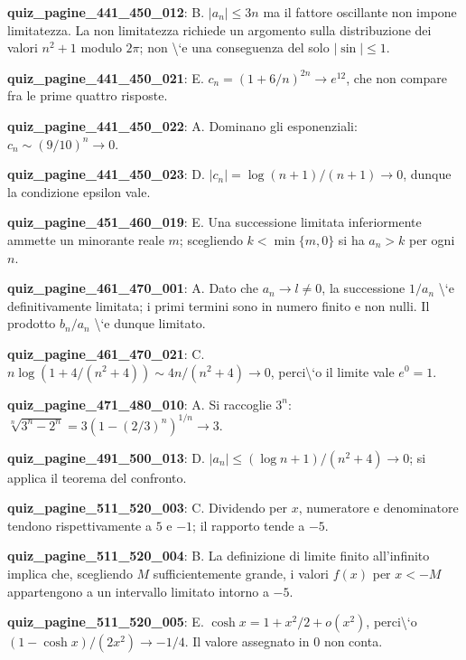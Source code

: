 \documentclass[11pt,a4paper]{article}
\newcounter{quiz}
\begin{document}
\noindent\textbf{quiz\_pagine\_441\_450\_012}: B. $|a_n|\le3n$ ma il fattore oscillante non impone limitatezza. La non limitatezza richiede un argomento sulla distribuzione dei valori $n^2+1$ modulo $2\pi$; non \textbackslash{}`e una conseguenza del solo $|\sin|\le1$.\par\medskip
\noindent\textbf{quiz\_pagine\_441\_450\_021}: E. $c_n=(1+6/n)^{2n}\to e^{12}$, che non compare fra le prime quattro risposte.\par\medskip
\noindent\textbf{quiz\_pagine\_441\_450\_022}: A. Dominano gli esponenziali: $c_n\sim(9/10)^n\to0$.\par\medskip
\noindent\textbf{quiz\_pagine\_441\_450\_023}: D. $|c_n|=\log(n+1)/(n+1)\to0$, dunque la condizione epsilon vale.\par\medskip
\noindent\textbf{quiz\_pagine\_451\_460\_019}: E. Una successione limitata inferiormente ammette un minorante reale $m$; scegliendo $k<\min\{m,0\}$ si ha $a_n>k$ per ogni $n$.\par\medskip
\noindent\textbf{quiz\_pagine\_461\_470\_001}: A. Dato che $a_n\to l\neq0$, la successione $1/a_n$ \textbackslash{}`e definitivamente limitata; i primi termini sono in numero finito e non nulli. Il prodotto $b_n/a_n$ \textbackslash{}`e dunque limitato.\par\medskip
\noindent\textbf{quiz\_pagine\_461\_470\_021}: C. $n\log(1+4/(n^2+4))\sim4n/(n^2+4)\to0$, perci\textbackslash{}`o il limite vale $e^0=1$.\par\medskip
\noindent\textbf{quiz\_pagine\_471\_480\_010}: A. Si raccoglie $3^n$: $\sqrt[n]{3^n-2^n}=3\left(1-(2/3)^n\right)^{1/n}\to3$.\par\medskip
\noindent\textbf{quiz\_pagine\_491\_500\_013}: D. $|a_n|\le(\log n+1)/(n^2+4)\to0$; si applica il teorema del confronto.\par\medskip
\noindent\textbf{quiz\_pagine\_511\_520\_003}: C. Dividendo per $x$, numeratore e denominatore tendono rispettivamente a $5$ e $-1$; il rapporto tende a $-5$.\par\medskip
\noindent\textbf{quiz\_pagine\_511\_520\_004}: B. La definizione di limite finito all'infinito implica che, scegliendo $M$ sufficientemente grande, i valori $f(x)$ per $x<-M$ appartengono a un intervallo limitato intorno a $-5$.\par\medskip
\noindent\textbf{quiz\_pagine\_511\_520\_005}: E. $\cosh x=1+x^2/2+o(x^2)$, perci\textbackslash{}`o $(1-\cosh x)/(2x^2)\to-1/4$. Il valore assegnato in $0$ non conta.\par\medskip
\end{document}
